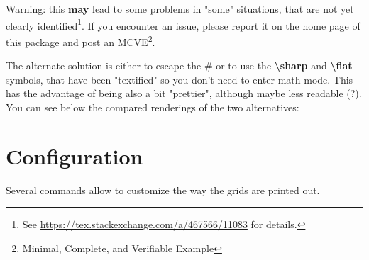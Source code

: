 \documentclass[11pt]{article}
\newcommand{\btt}{\bfseries \ttfamily }
\newcommand{\tbs}{\textbackslash{}}
\begin{document}
Warning: this {\bf may} lead to some problems in "some" situations, that are not yet clearly identified\footnote{See \url{https://tex.stackexchange.com/a/467566/11083} for details.}.
If you encounter an issue, please report it on the home page of this package and post an MCVE\footnote{Minimal, Complete, and Verifiable Example}.

The alternate solution is either to escape the \# or to use the {\btt \tbs sharp} and {\btt \tbs flat} symbols, that have been "textified" so you don't need to enter math mode.
This has the advantage of being also a bit "prettier", although maybe less readable (?).
You can see below the compared renderings of the two alternatives:

\vspace{1em}

\noindent
\begin{minipage}{0.54\textwidth}

\end{minipage}
%
\begin{minipage}{0.42\textwidth}

\end{minipage}

\section{Configuration}

Several commands allow to customize the way the grids are printed out.
\end{document}
